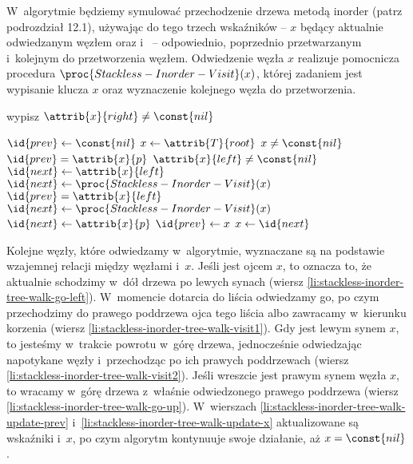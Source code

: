 \exercise %
W~algorytmie będziemy symulować przechodzenie drzewa metodą inorder (patrz podrozdział 12.1), używając do tego trzech wskaźników -- $x$ będący aktualnie odwiedzanym węzłem oraz  i~ -- odpowiednio, poprzednio przetwarzanym i~kolejnym do przetworzenia węzłem.
Odwiedzenie węzła $x$ realizuje pomocnicza procedura $\proc{Stackless-Inorder-Visit}(x)$, której zadaniem jest wypisanie klucza $x$ oraz wyznaczenie kolejnego węzła do przetworzenia.
\begin{codebox}
\li	wypisz 
\li	\If $\attrib{x}{right}\ne\const{nil}$
\li		\Then \Return {}
\li		\Else \Return {}
		\End
\end{codebox}

\begin{codebox}
\li	$\id{prev}\gets\const{nil}$
\li	$x\gets\attrib{T}{root}$
\li	\While $x\ne\const{nil}$
\li		\Do \If $\id{prev}=\attrib{x}{p}$
\li				\Then \If $\attrib{x}{left}\ne\const{nil}$
\li						\Then $\id{next}\gets\attrib{x}{left}$ \label{li:stackless-inorder-tree-walk-go-left}
\li						\Else $\id{next}\gets\proc{Stackless-Inorder-Visit}(x)$ \label{li:stackless-inorder-tree-walk-visit1}
						\End
\li				\ElseIf $\id{prev}=\attrib{x}{left}$
\li					\Then $\id{next}\gets\proc{Stackless-Inorder-Visit}(x)$ \label{li:stackless-inorder-tree-walk-visit2}
\li				\ElseNoIf $\id{next}\gets\attrib{x}{p}$ \label{li:stackless-inorder-tree-walk-go-up}
				\End
\li			$\id{prev}\gets x$ \label{li:stackless-inorder-tree-walk-update-prev}
\li			$x\gets\id{next}$ \label{li:stackless-inorder-tree-walk-update-x}
		\End
\end{codebox}

Kolejne węzły, które odwiedzamy w~algorytmie, wyznaczane są na podstawie wzajemnej relacji między węzłami  i~$x$.
Jeśli  jest ojcem $x$, to oznacza to, że aktualnie schodzimy w~dół drzewa po lewych synach (wiersz \ref{li:stackless-inorder-tree-walk-go-left}).
W~momencie dotarcia do liścia odwiedzamy go, po czym przechodzimy do prawego poddrzewa ojca tego liścia albo zawracamy w~kierunku korzenia (wiersz \ref{li:stackless-inorder-tree-walk-visit1}).
Gdy  jest lewym synem $x$, to jesteśmy w~trakcie powrotu w~górę drzewa, jednocześnie odwiedzając napotykane węzły i~przechodząc po ich prawych poddrzewach (wiersz \ref{li:stackless-inorder-tree-walk-visit2}).
Jeśli wreszcie  jest prawym synem węzła $x$, to wracamy w~górę drzewa z~właśnie odwiedzonego prawego poddrzewa (wiersz \ref{li:stackless-inorder-tree-walk-go-up}).
W~wierszach \ref{li:stackless-inorder-tree-walk-update-prev} i~\ref{li:stackless-inorder-tree-walk-update-x} aktualizowane są wskaźniki  i~$x$, po czym algorytm kontynuuje swoje działanie, aż $x=\const{nil}$.

